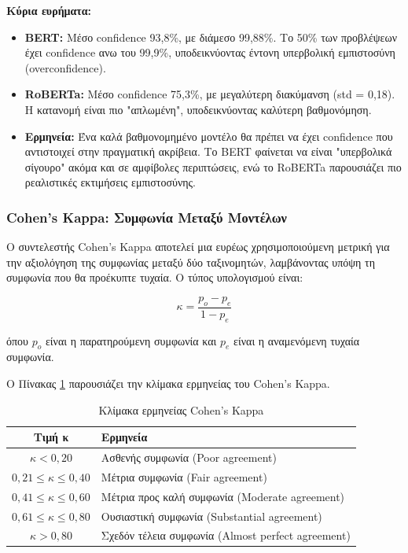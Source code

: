 \documentclass[a4paper,11pt,oneside,openany]{ioniothesis}
\begin{document}
\textbf{Κύρια ευρήματα:}
\begin{itemize}
    \item \textbf{BERT:} Μέσο confidence 93,8\%, με διάμεσο 99,88\%. Το 50\% των προβλέψεων έχει confidence ανω του 99,9\%, υποδεικνύοντας έντονη υπερβολική εμπιστοσύνη (overconfidence).
    
    \item \textbf{RoBERTa:} Μέσο confidence 75,3\%, με μεγαλύτερη διακύμανση (std = 0,18). Η κατανομή είναι πιο "απλωμένη", υποδεικνύοντας καλύτερη βαθμονόμηση.
    
    \item \textbf{Ερμηνεία:} Ένα καλά βαθμονομημένο μοντέλο θα πρέπει να έχει confidence που αντιστοιχεί στην πραγματική ακρίβεια. Το BERT φαίνεται να είναι "υπερβολικά σίγουρο" ακόμα και σε αμφίβολες περιπτώσεις, ενώ το RoBERTa παρουσιάζει πιο ρεαλιστικές εκτιμήσεις εμπιστοσύνης.
\end{itemize}








\subsubsection{Cohen's Kappa: Συμφωνία Μεταξύ Μοντέλων}
\label{sec:Cohen's Kappa}

Ο συντελεστής Cohen's Kappa αποτελεί μια ευρέως χρησιμοποιούμενη μετρική για την αξιολόγηση της συμφωνίας μεταξύ δύο ταξινομητών, λαμβάνοντας υπόψη τη συμφωνία που θα προέκυπτε τυχαία. Ο τύπος υπολογισμού είναι:

\begin{equation}
\kappa = \frac{p_o - p_e}{1 - p_e}
\label{eq:kappa}
\end{equation}

όπου $p_o$ είναι η παρατηρούμενη συμφωνία και $p_e$ είναι η αναμενόμενη τυχαία συμφωνία.

Ο Πίνακας \ref{tab:kappa_interpretation} παρουσιάζει την κλίμακα ερμηνείας του Cohen's Kappa.

\begin{table}[H]
\centering
\caption{Κλίμακα ερμηνείας Cohen's Kappa}
\label{tab:kappa_interpretation}
\begin{tabular}{@{}cl@{}}
\toprule
\textbf{Τιμή κ} & \textbf{Ερμηνεία} \\
\midrule
$\kappa < 0,20$ & Ασθενής συμφωνία (Poor agreement) \\
$0,21 \leq \kappa \leq 0,40$ & Μέτρια συμφωνία (Fair agreement) \\
$0,41 \leq \kappa \leq 0,60$ & Μέτρια προς καλή συμφωνία (Moderate agreement) \\
$0,61 \leq \kappa \leq 0,80$ & Ουσιαστική συμφωνία (Substantial agreement) \\
$\kappa > 0,80$ & Σχεδόν τέλεια συμφωνία (Almost perfect agreement) \\
\bottomrule
\end{tabular}
\end{table}
\end{document}
